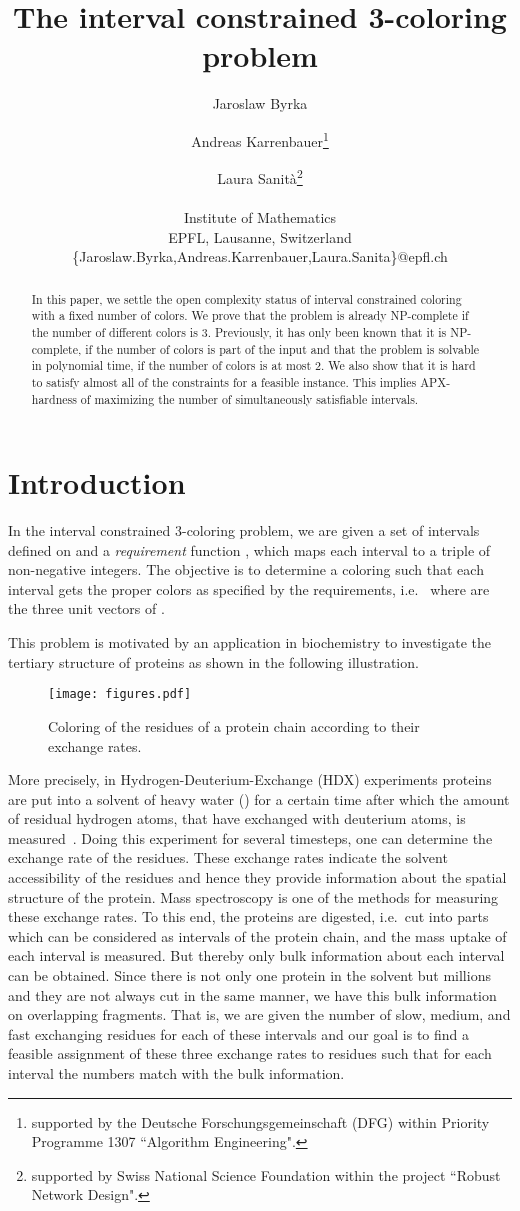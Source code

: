 \documentclass[a4paper,11pt]{article}
\author{Jaroslaw Byrka \and Andreas Karrenbauer\thanks{supported by the Deutsche Forschungsgemeinschaft (DFG)  within  Priority Programme 1307  ``Algorithm Engineering".}
 \and Laura Sanit\`a\thanks{supported by Swiss National Science Foundation within the project  ``Robust Network Design".} \\ \\
Institute of Mathematics \\ 
					EPFL, Lausanne, Switzerland \\
					{\{Jaroslaw.Byrka,Andreas.Karrenbauer,Laura.Sanita\}@epfl.ch}
}
\date{}
\title{The interval constrained 3-coloring problem}
\theoremstyle{theorem}
\begin{document}
\maketitle

\begin{abstract}
In this paper, we settle the open complexity status of interval constrained coloring with a fixed number of colors. We prove that the problem is already NP-complete if the number of different colors is 3. Previously, it has only been known that it is NP-complete, if the number of colors is part of the input and that the problem is solvable in polynomial time, if the number of colors is at most 2. We also show that it is hard to satisfy almost all of the constraints for a feasible instance. This implies APX-hardness of maximizing the number of simultaneously satisfiable intervals.
\end{abstract}

\section{Introduction}

In the interval constrained 3-coloring problem, we are given a set  of intervals defined on  and a \emph{requirement} function , which maps each interval to a triple of non-negative integers. The objective is to determine a coloring  such that each interval gets the proper colors as specified by the requirements, i.e.~ where  are the three unit vectors of .

This problem is motivated by an application in biochemistry to investigate the tertiary structure of proteins as shown in the following illustration.
\begin{figure}[hb]
 \centering
 \texttt{[image: figures.pdf]}
 \caption{Coloring of the residues of a protein chain according to their exchange rates.}
 \label{fig:bio}
\end{figure}
More precisely, in Hydrogen-Deuterium-Exchange (HDX) experiments proteins are put into a solvent of heavy water () for a certain time after which the amount of residual hydrogen atoms, that have exchanged with deuterium atoms, is measured~\cite{LEHMP02}. Doing this experiment for several timesteps, one can determine the exchange rate of the residues. These exchange rates indicate the solvent accessibility of the residues and hence they provide information about the spatial structure of the protein. Mass spectroscopy is one of the methods for measuring these exchange rates. To this end, the proteins are digested, i.e.~cut into parts which can be considered as intervals of the protein chain, and the mass uptake of each interval is measured. But thereby only bulk information about each interval can be obtained. Since there is not only one protein in the solvent but millions and they are not always cut in the same manner, we have this bulk information on overlapping fragments. That is, we are given the number of slow, medium, and fast exchanging residues for each of these intervals and our goal is to find a feasible assignment of these three exchange rates to residues such that for each interval the numbers match with the bulk information. 
\end{document}
